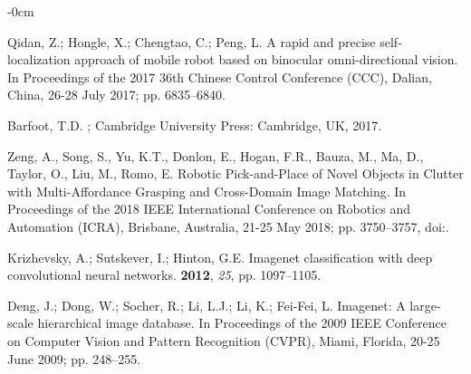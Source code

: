 \documentclass[micromachines,article,accept,pdftex,moreauthors]{Definitions/mdpi}
\begin{document}

\begin{adjustwidth}{-\extralength}{0cm}
{}

\begin{thebibliography}{999}
Qidan, Z.; Hongle, X.; Chengtao, C.; Peng, L.
\newblock A rapid and precise self-localization approach of mobile robot based on binocular omni-directional vision.
\newblock In Proceedings of the  2017 36th Chinese Control Conference (CCC), {Dalian, China, 26-28 July} 2017; pp. 6835--6840.

Barfoot, T.D.
; Cambridge University Press: Cambridge, UK, 2017.

 {{Zeng, A., Song, S., Yu, K.T., Donlon, E., Hogan, F.R., Bauza, M., Ma, D., Taylor, O., Liu, M., Romo, E.}}  %
\newblock Robotic Pick-and-Place of Novel Objects in Clutter with Multi-Affordance Grasping and Cross-Domain Image Matching.
\newblock In Proceedings of the 2018 IEEE International Conference on Robotics and Automation (ICRA), {Brisbane, Australia, 21-25 May} 2018; pp. 3750--3757,
\newblock
doi:{\href{https://doi.org/10.1109/ICRA.2018.8461044}{}}.

Krizhevsky, A.; Sutskever, I.; Hinton, G.E.
\newblock Imagenet classification with deep convolutional neural networks.
 {\bf 2012}, {\em 25}, {pp. 1097--1105}.

Deng, J.; Dong, W.; Socher, R.; Li, L.J.; Li, K.; Fei-Fei, L.
\newblock Imagenet: A large-scale hierarchical image database.
\newblock In Proceedings of the  2009 IEEE Conference on Computer Vision and Pattern Recognition {(CVPR), Miami, Florida, 20-25 June 2009;} pp. 248--255.


\end{thebibliography}
\end{adjustwidth}
\end{document}
